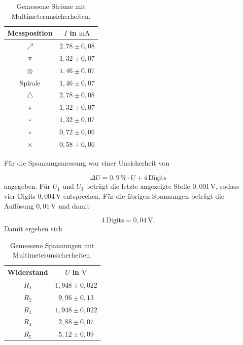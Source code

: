 \documentclass{report}
\begin{document}
\begin{table}[htbp]
    \centering
    \caption{Gemessene Ströme mit Multimeterunsicherheiten.}
    \label{tab:stroeme_tv5}
    \begin{tabular}{c|c}
        \hline
        Messposition & $I$ in $\mathrm{mA}$\\
        \hline
        $\nearrow$       & $2{,}78\pm0{,}08$\\
        $\triangledown$  & $1{,}32\pm0{,}07$\\
        $\otimes$        & $1{,}46\pm0{,}07$\\
        Spirale          & $1{,}46\pm0{,}07$\\
        $\triangle$      & $2{,}78\pm0{,}08$\\
        $\star$          & $1{,}32\pm0{,}07$\\
        $\square$        & $1{,}32\pm0{,}07$\\
        $\circ$          & $0{,}72\pm0{,}06$\\
        $\times$         & $0{,}58\pm0{,}06$\\
        \hline
    \end{tabular}
\end{table}
\noindent
Für die Spannungsmessung war einer Unsicherheit von 

\begin{equation}
\Delta U
=
0{,}9\,\%\cdot U+4\,\mathrm{Digits}
\end{equation}
\noindent
angegeben.
\noindent
Für $U_1$ und $U_3$ beträgt die letzte angezeigte Stelle
$0{,}001\,\mathrm{V}$, sodass vier Digits $0{,}004\,\mathrm{V}$
entsprechen. Für die übrigen Spannungen beträgt die Auflösung
$0{,}01\,\mathrm{V}$ und damit

\begin{equation}
4\,\mathrm{Digits}=0{,}04\,\mathrm{V}.
\end{equation}
\noindent
Damit ergeben sich

\begin{table}[htbp]
    \centering
    \caption{Gemessene Spannungen mit Multimeterunsicherheiten.}
    \label{tab:spannungen_tv5}
    \begin{tabular}{c|c}
        \hline
        Widerstand & $U$ in $\mathrm{V}$\\
        \hline
        $R_1$ & $1{,}948\pm0{,}022$\\
        $R_2$ & $9{,}96\pm0{,}13$\\
        $R_3$ & $1{,}948\pm0{,}022$\\
        $R_4$ & $2{,}88\pm0{,}07$\\
        $R_5$ & $5{,}12\pm0{,}09$\\
        \hline
    \end{tabular}
\end{table}
\end{document}
